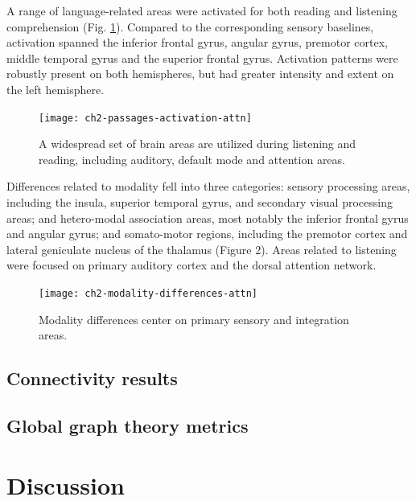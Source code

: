 A range of language-related areas were activated for both reading and listening comprehension (Fig. \ref{fig:ch2-passages-activation-attn}). Compared to the corresponding sensory baselines, activation spanned the inferior frontal gyrus, angular gyrus, premotor cortex, middle temporal gyrus and the superior frontal gyrus. Activation patterns were robustly present on both hemispheres, but had greater intensity and extent on the left hemisphere. 

\begin{figure}[tp]
	\centering
	\texttt{[image: ch2-passages-activation-attn]}
    \caption[There is significant overlap between the areas used in listening and reading.]{A widespread set of brain areas are utilized during listening and reading, including auditory, default mode and attention areas.}
	\label{fig:ch2-passages-activation-attn}
\end{figure}

Differences related to modality fell into three categories: sensory processing areas, including the insula, superior temporal gyrus, and secondary visual processing areas; and hetero-modal association areas, most notably the inferior frontal gyrus and angular gyrus; and somato-motor regions, including the premotor cortex and lateral geniculate nucleus of the thalamus (Figure 2). Areas related to listening were focused on primary auditory cortex and the dorsal attention network. 

\begin{figure}[!b]
	\centering
	\texttt{[image: ch2-modality-differences-attn]}
    \caption[Modality differences center on primary sensory and integration areas.]{Modality differences center on primary sensory and integration areas.}
	\label{fig:ch2-modality-differences-attn}
\end{figure}

\subsection{Connectivity results}


\subsection{Global graph theory metrics}


\section{Discussion}